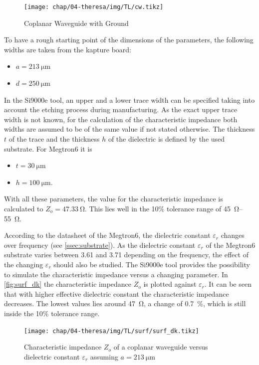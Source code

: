 \begin{figure}[!htbp]
	\centering
	\texttt{[image: chap/04-theresa/img/TL/cw.tikz]}
	\caption{Coplanar Waveguide with Ground}
	\label{fig:microstrip_geometry}
\end{figure}

To have a rough starting point of the dimensions of the parameters, the following widths are taken from the \gls{kapture} board:
\begin{itemize}
	\item $a = \SI{213}{\micro \meter}$
	\item $d = \SI{250}{\micro \meter}$
\end{itemize}
In the Si9000e tool, an upper and a lower trace width can be specified taking into account the etching process during manufacturing.
As the exact upper trace width is not known, for the calculation of the characteristic impedance both widths are assumed to be of the same value if not stated otherwise.
The thickness $t$ of the trace and the thickness $h$ of the dielectric is defined by the used substrate.
For Megtron6 it is 
\begin{itemize}
	\item $t = \SI{30}{\micro \meter}$
	\item $h = \SI{100}{\micro \meter}$.
\end{itemize}
With all these parameters, the value for the characteristic impedance is calculated to $Z_o = \SI{47.33}{\ohm}$.
This lies well in the 10\% tolerance range of \SIrange{45}{55}{\ohm}. 

According to the datasheet of the Megtron6, the dielectric constant $\varepsilon_r$ changes over frequency (see \autoref{ssec:substrate}).
As the dielectric constant $\varepsilon_r$ of the Megtron6 substrate varies between 3.61 and 3.71 depending on the frequency, the effect of the changing $\varepsilon_r$ should also be studied. 
The Si9000e tool provides the possibility to simulate the characteristic impedance versus a changing parameter.
In \autoref{fig:surf_dk} the characteristic impedance $Z_o$ is plotted against $\varepsilon_r$.
It can be seen that with higher effective dielectric constant the characteristic impedance decreases.
The lowest values lies around \SI{47}{\ohm}, a change of \SI{0.7}{\percent}, which is still inside the 10\% tolerance range.
\begin{figure}[tbh]
	\centering
	\texttt{[image: chap/04-theresa/img/TL/surf/surf\_dk.tikz]}
	\caption[CWG, $Z_o$ vs $\varepsilon_r$]{Characteristic impedance $Z_o$ of a coplanar waveguide versus dielectric constant $\varepsilon_r$ assuming $a = \SI{213}{\micro \meter}$}
	\label{fig:surf_dk}
\end{figure}

